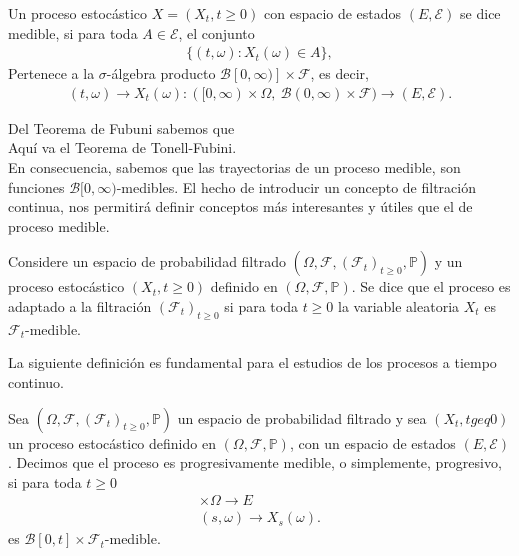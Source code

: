 \begin{definition}
	Un proceso estocástico $X = (X_t, t \geq 0)$ con espacio de estados $(E, \mathcal{E})$ se dice medible, si para toda $A \in \mathcal{E}$, el conjunto
	\begin{align*}
	\{ (t, \omega) : X_t (\omega) \in A \},
	\end{align*}
	Pertenece a la $\sigma$-álgebra producto $\mathcal{B} [0, \infty)] \times \mathcal{F}$, es decir,
	\begin{align*}
	(t, \omega) \rightarrow X_t(\omega) : ([0, \infty) \times \Omega, \ \mathcal{B}(0, \infty) \times \mathcal{F} ) \rightarrow (E, \mathcal{E}).
	\end{align*}
\end{definition}

Del Teorema de Fubuni sabemos que \\

Aquí va el Teorema de Tonell-Fubini. \\

En consecuencia, sabemos que las trayectorias de un proceso medible, son funciones $\mathcal{B}[0, \infty)$-medibles. El hecho de introducir un concepto de filtración continua, nos permitirá definir conceptos más interesantes y útiles que el de proceso medible.

\begin{definition}
	Considere un espacio de probabilidad filtrado  $(\Omega, \mathcal{F}, (\mathcal{F}_t)_{t \geq 0}, \mathbb{P})$ y un proceso estocástico $(X_t, t \geq 0)$ definido en  $(\Omega, \mathcal{F}, \mathbb{P})$. Se dice que el proceso es adaptado a la filtración $(\mathcal{F}_t)_{t \geq 0}$ si para toda $t \geq 0$ la variable aleatoria $X_t$ es $\mathcal{F}_t$-medible.
\end{definition}

La siguiente definición es fundamental para el estudios de los procesos a tiempo continuo.

\begin{definition}
	Sea $(\Omega, \mathcal{F}, (\mathcal{F}_t)_{t \geq 0}, \mathbb{P})$ un espacio de probabilidad filtrado y sea $(X_t, t geq 0)$ un proceso estocástico definido en $(\Omega, \mathcal{F}, \mathbb{P})$, con un espacio de estados $(E, \mathcal{E})$. Decimos que el proceso es progresivamente medible, o simplemente, progresivo, si para toda $t \geq 0$
	\begin{align*}
		[0, t] \times \Omega \rightarrow E \\
		(s, \omega) \rightarrow X_s (\omega).
	\end{align*}
	es $\mathcal{B}[0, t] \times \mathcal{F}_t$-medible.
\end{definition}

